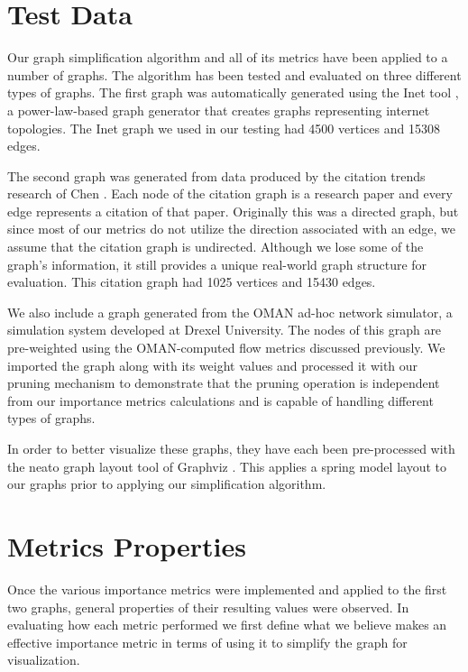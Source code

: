 \section{Test Data}
\label{sect:Data}
Our graph simplification algorithm and all of its metrics have been applied to a number of graphs.  The algorithm has been tested and evaluated on three different types of graphs. The first graph was automatically generated using the  Inet tool \cite{Winik-Jamin02}, a power-law-based graph generator that creates graphs representing internet topologies.  The Inet graph we used in our testing had 4500 vertices and 15308 edges.

The second graph was generated from data produced by the citation trends research of Chen \cite{Chen06}.  Each node of the citation graph is a research paper and every edge represents a citation of that paper.  Originally this was a directed graph, but since most of our metrics do not utilize the direction associated with an edge, we assume that the citation graph is undirected.  Although we lose some of the graph's information, it still provides a unique real-world graph structure for evaluation.  This citation graph had 1025 vertices and 15430 edges.

We also include a graph generated from the OMAN  ad-hoc network simulator, a simulation system developed at Drexel University.  The nodes of this graph are pre-weighted using the OMAN-computed flow metrics discussed previously.  We imported the graph along with its weight values and processed it with our pruning mechanism to demonstrate that the pruning operation is independent from our importance metrics calculations and is capable of handling different types of graphs.

In order to better visualize these graphs, they have each been pre-processed with the neato graph layout tool of Graphviz \cite{Graphviz}.  This applies a spring model layout to our graphs prior to applying our simplification algorithm.

\section{Metrics Properties}

Once the various importance metrics were implemented and applied to the first two graphs, general properties of their resulting values were observed.  In evaluating how each metric performed we first define what we believe makes an effective importance metric in terms of using it to simplify the graph
for visualization.

